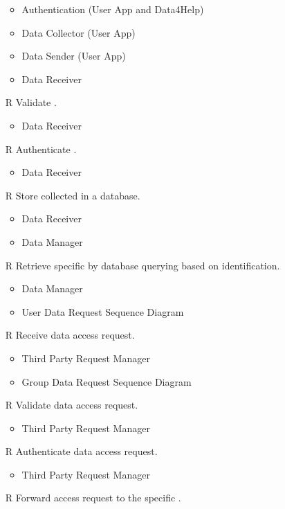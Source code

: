 \begin{itemize}
\begin{itemize}
		\item Authentication (User App and Data4Help)
		\item Data Collector (User App)
		\item Data Sender (User App)
		\item Data Receiver
	\end{itemize}
	\item[R\subs{9}]Validate .
	\begin{itemize}
		\item Data Receiver
	\end{itemize}
	\item[R\subs{10}]Authenticate .
	\begin{itemize}
		\item Data Receiver
	\end{itemize}
	\item[R\subs{11}]Store collected  in a database.
	\begin{itemize}
		\item Data Receiver
		\item Data Manager
	\end{itemize}
	\item[R\subs{12}]Retrieve specific  by database querying based on  identification.
	\begin{itemize}
		\item Data Manager
		\item User Data Request Sequence Diagram
	\end{itemize}
	\item[R\subs{13}]Receive  data access request.
	\begin{itemize}
		\item Third Party Request Manager
		\item Group Data Request Sequence Diagram
	\end{itemize}
	\item[R\subs{14}]Validate  data access request.
	\begin{itemize}
		\item Third Party Request Manager
	\end{itemize}
	\item[R\subs{15}]Authenticate  data access request.
	\begin{itemize}
		\item Third Party Request Manager
	\end{itemize}
	\item[R\subs{16}]Forward  access request to the specific .

\end{itemize}
